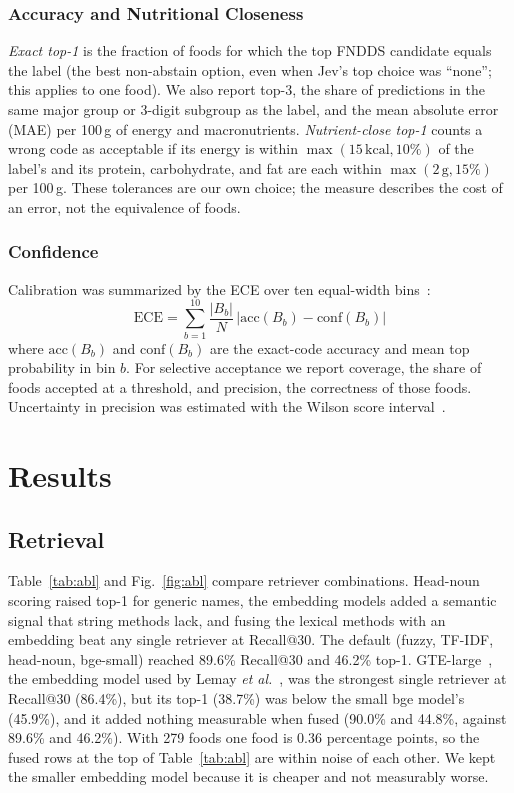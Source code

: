 \documentclass[11pt,journal,onecolumn]{IEEEtran}
\begin{document}
\subsubsection{Accuracy and Nutritional Closeness}
\emph{Exact top-1} is the fraction of foods for which the top FNDDS candidate equals the label (the best non-abstain option, even when Jev's top choice was ``none''; this applies to one food). We also report top-3, the share of predictions in the same major group or 3-digit subgroup as the label, and the mean absolute error (MAE) per 100\,g of energy and macronutrients. \emph{Nutrient-close top-1} counts a wrong code as acceptable if its energy is within $\max(15\,\mathrm{kcal},10\%)$ of the label's and its protein, carbohydrate, and fat are each within $\max(2\,\mathrm{g},15\%)$ per 100\,g. These tolerances are our own choice; the measure describes the cost of an error, not the equivalence of foods.

\subsubsection{Confidence}
Calibration was summarized by the ECE over ten equal-width bins~\cite{naeini,guo}:
\begin{equation}
\mathrm{ECE}=\sum_{b=1}^{10}\frac{|B_b|}{N}\,\left|\mathrm{acc}(B_b)-\mathrm{conf}(B_b)\right|
\end{equation}
where $\mathrm{acc}(B_b)$ and $\mathrm{conf}(B_b)$ are the exact-code accuracy and mean top probability in bin $b$. For selective acceptance we report coverage, the share of foods accepted at a threshold, and precision, the correctness of those foods. Uncertainty in precision was estimated with the Wilson score interval~\cite{wilson}.

\section{Results}
\subsection{Retrieval}
Table~\ref{tab:abl} and Fig.~\ref{fig:abl} compare retriever combinations. Head-noun scoring raised top-1 for generic names, the embedding models added a semantic signal that string methods lack, and fusing the lexical methods with an embedding beat any single retriever at Recall@30. The default (fuzzy, TF-IDF, head-noun, bge-small) reached 89.6\% Recall@30 and 46.2\% top-1. GTE-large~\cite{gte}, the embedding model used by Lemay \emph{et al.}~\cite{lemay}, was the strongest single retriever at Recall@30 (86.4\%), but its top-1 (38.7\%) was below the small bge model's (45.9\%), and it added nothing measurable when fused (90.0\% and 44.8\%, against 89.6\% and 46.2\%). With 279 foods one food is 0.36 percentage points, so the fused rows at the top of Table~\ref{tab:abl} are within noise of each other. We kept the smaller embedding model because it is cheaper and not measurably worse.
\end{document}
